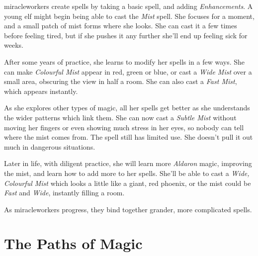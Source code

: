 {\begin{figure*}[b!]
\begin{tcolorbox}[tabularx={lp{.25\textwidth}X},top=10pt,bottom=10pt]
\end{tcolorbox}

\end{figure*}

\Glspl{miracleworker} create spells by taking a basic spell, and adding \textit{Enhancements}.
A young elf might begin being able to cast the \textit{Mist} spell.
She focuses for a moment, and a small patch of mist forms where she looks.
She can cast it a few times before feeling tired, but if she pushes it any further she'll end up feeling sick for weeks.

After some years of practice, she learns to modify her spells in a few ways.
She can make \textit{Colourful Mist} appear in red, green or blue, or cast a \textit{Wide Mist} over a small area, obscuring the view in half a room.
She can also cast a \textit{Fast Mist}, which appears instantly.

As she explores other types of magic, all her spells get better as she understands the wider patterns which link them.
She can now cast a \textit{Subtle Mist} without moving her fingers or even showing much stress in her eyes, so nobody can tell where the mist comes from.
The spell still has limited use.
She doesn't pull it out much in dangerous situations.

Later in life, with diligent practice, she will learn more \textit{Aldaron} magic, improving the mist, and learn how to add more to her spells.
She'll be able to cast a \textit{Wide, Colourful Mist} which looks a little like a giant, red phoenix, or the mist could be \textit{Fast} and \textit{Wide}, instantly filling a room.

As \glspl{miracleworker} progress, they bind together grander, more complicated spells.

}{}

\section{The Paths of Magic}

